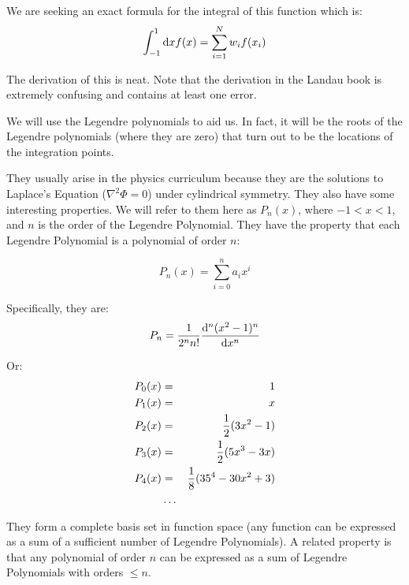 We are seeking an exact formula for the integral of this function
which is:
\begin{equation}
\int_{-1}^{1} {\rm d}x f(x) = \sum_{i=1}^N w_i f(x_i)
\end{equation}

The derivation of this is neat. Note that the derivation in the Landau
book is extremely confusing and contains at least one error.

We will use the Legendre polynomials to aid us. In fact, it will be
the roots of the Legendre polynomials (where they are zero) that turn
out to be the locations of the integration points.


\begin{answer}
  They usually arise in the physics curriculum because they are the
  solutions to Laplace's Equation ($\nabla^2 \Phi =0$) under
  cylindrical symmetry. They also have some interesting properties. We
  will refer to them here as $P_n(x)$, where $-1 < x < 1$, and $n$ is
  the order of the Legendre Polynomial. They have the property that
  each Legendre Polynomial is a polynomial of order $n$:

  \begin{equation}
    P_n(x) = \sum_{i=0}^n a_i x^i 
  \end{equation}

  Specifically, they are:
  \begin{equation}
    P_n = \frac{1}{2^n n!} \frac{{\rm d}^n(x^2 -1)^n}{{\rm d} x^n}
  \end{equation}

  Or:
  \begin{eqnarray}
    P_0(x) &=& 1 \cr
    P_1(x) &=& x \cr
    P_2(x) &=& \frac{1}{2}(3x^2 -1) \cr
    P_3(x) &=& \frac{1}{2}(5x^3 - 3x) \cr
    P_4(x) &=& \frac{1}{8}(35^4 - 30x^2 + 3) \cr
    &\ldots& 
  \end{eqnarray}

  They form a complete basis set in function space (any function can be
  expressed as a sum of a sufficient number of Legendre Polynomials).
  A related property is that any polynomial of order $n$ can be
  expressed as a sum of Legendre Polynomials with orders $\le n$.
\end{answer}


